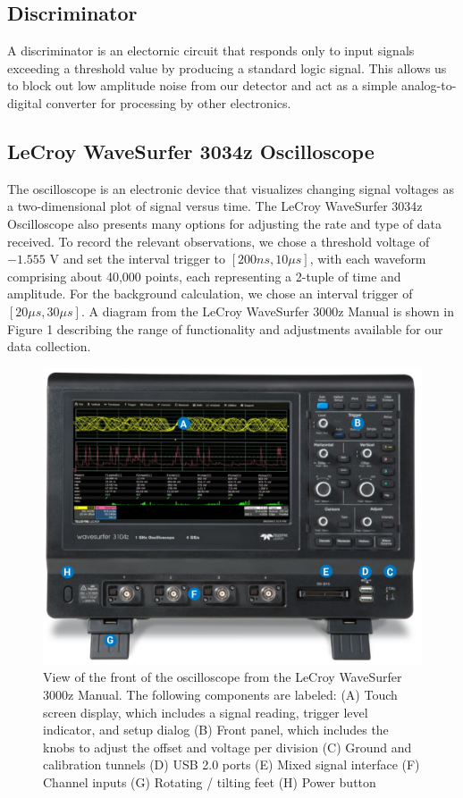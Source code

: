 \documentclass[
 reprint,
 twocolumn,
 amsmath,amssymb,
 aps,
 pra,
 floatfix,
]{revtex4-1}
\begin{document}
\subsection{Discriminator}

A discriminator is an electornic circuit that responds only to input signals
exceeding a threshold value by producing a standard logic signal. This allows
us to block out low amplitude noise from our detector and act as a simple
analog-to-digital converter for processing by other electronics.

\subsection{LeCroy WaveSurfer 3034z Oscilloscope}

The oscilloscope is an electronic device that visualizes changing signal
voltages as a two-dimensional plot of signal versus time. The LeCroy WaveSurfer
3034z Oscilloscope also presents many options for adjusting the rate and type
of data received. To record the relevant observations, we chose a threshold voltage
of $-1.555$ V and set the interval
trigger to $[200 ns, 10 \mu s]$, with each waveform comprising about 40,000
points, each representing a 2-tuple of time and amplitude. For the background
calculation, we chose an interval trigger of $[20 \mu s, 30 \mu s]$. A diagram
from the LeCroy WaveSurfer 3000z Manual is shown in Figure 1 describing the
range of functionality and adjustments available for our data collection.

\begin{figure}
    \includegraphics[width=0.9\columnwidth]{lecroy.png}
    \centering
    \caption{View of the front of the oscilloscope from the LeCroy WaveSurfer
             3000z Manual. The following components are labeled: (A) Touch
             screen display, which includes a signal reading, trigger level
             indicator, and setup dialog (B) Front panel, which includes the
             knobs to adjust the offset and voltage per division (C) Ground and
             calibration tunnels (D) USB 2.0 ports (E) Mixed signal interface
             (F) Channel inputs (G) Rotating / tilting feet (H) Power button}
\end{figure}
\end{document}
